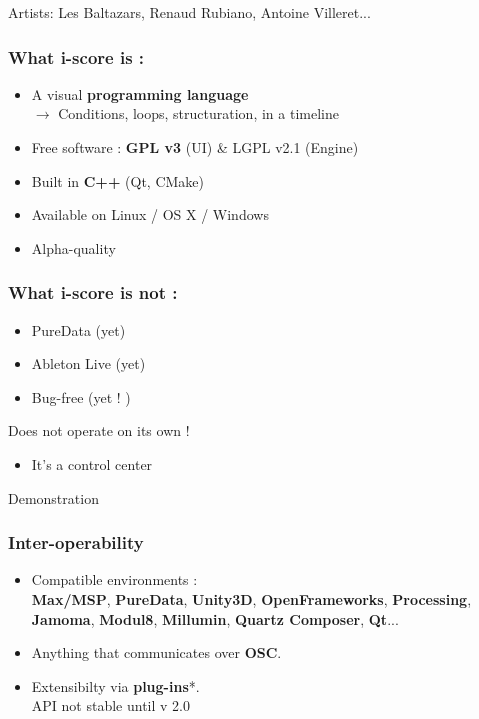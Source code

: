 \documentclass{beamer}
\begin{document}
\begin{frame}
    {\large Artists: Les Baltazars, Renaud Rubiano, Antoine Villeret...}
    
\end{frame}

    \begin{frame}
        \frametitle{What i-score is : }
        \Large
        \begin{itemize}        
        \item A visual \textbf{programming language} \\ $\rightarrow$ Conditions, loops, structuration, in a timeline
        \item Free software : \textbf{GPL v3 }(UI) \& LGPL v2.1 (Engine)
        \item Built in \textbf{C++} (Qt, CMake)        
        \item Available on Linux / OS X / Windows        
        \item Alpha-quality 
        \end{itemize}
    \end{frame}
    \begin{frame}
        \frametitle{What i-score is not : }
        \Large
        \begin{itemize} 
            \item PureData (yet)
            \item Ableton Live (yet)       
            \item Bug-free (yet ! )
        \end{itemize}
        \vspace{2em}
        \Huge Does not operate on its own !
        
        \Large
        \begin{itemize} 
            \item  It's a control center
        \end{itemize}
    \end{frame}
    
    \begin{frame}
    	\centering \Huge Demonstration
    \end{frame}
    
    \begin{frame}
        \frametitle{Inter-operability}
        \Large
        \begin{itemize}
        	\item Compatible environments :\\
	        	 \textbf{Max/MSP}, \textbf{PureData}, \textbf{Unity3D}, \textbf{OpenFrameworks}, \textbf{Processing}, \textbf{Jamoma}, \textbf{Modul8}, \textbf{Millumin}, \textbf{Quartz Composer}, \textbf{Qt}... 
	        \item Anything that communicates over \textbf{OSC}.
	        \item Extensibilty via \textbf{plug-ins}*. \\ {\small *API not stable until v 2.0}
        \end{itemize}
        
    \end{frame}
    
\end{document}
